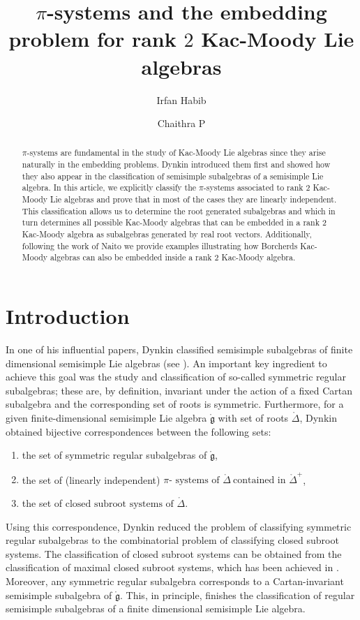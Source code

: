 \documentclass[12pt,reqno]{amsart}
\title{$\pi$-systems and the embedding problem for rank $2$ Kac-Moody Lie algebras}
\author{Irfan Habib}\address{Department of Mathematics, Indian Institute of Science, Bangalore 560012}
\author{Chaithra P}
\theoremstyle{plain}
\theoremstyle{definition}
\theoremstyle{remark}
\newcommand{\lie}[1]{\mathfrak{#1}}
\begin{document}
\begin{abstract}
    $\pi$-systems are fundamental in the study of Kac-Moody Lie algebras since they arise naturally in the embedding problems. Dynkin introduced them first and showed how they also appear in the classification of semisimple subalgebras of a semisimple Lie algebra. In this article, we explicitly classify the $\pi$-systems associated to rank $2$ Kac-Moody Lie algebras and prove that in most of the cases they are linearly independent. This classification allows us to determine the root generated subalgebras and which in turn determines all possible Kac-Moody algebras that can be embedded in a rank $2$ Kac-Moody algebra as subalgebras generated by real root vectors. Additionally, following the work of Naito we provide examples illustrating how Borcherds Kac-Moody algebras can also be embedded inside a rank $2$ Kac-Moody algebra.
\end{abstract}
\maketitle
\section{Introduction}

In one of his influential papers, Dynkin classified semisimple subalgebras of finite dimensional semisimple Lie algebras (see \cite{dynkin1952semisimple}). An important key ingredient to achieve this goal was the study and classification of so-called symmetric regular subalgebras; these are, by definition, invariant under the action of a fixed Cartan subalgebra and the corresponding set of roots is symmetric. Furthermore, for a given finite-dimensional semisimple Lie algebra $\mathring{\lie g}$ with set of roots $\mathring{\Delta}$, Dynkin obtained bijective correspondences between the following sets: 
\begin{enumerate}
 \item  the set of symmetric regular subalgebras of $\mathring{\lie g}$,
     \item the set of (linearly independent) $ \pi\text{- systems of }\mathring{\Delta}\ \text{contained in  } \mathring{\Delta}^+$,
     \item the set of $ \text{closed subroot systems of } \mathring{\Delta}$.
 \end{enumerate}
 Using this correspondence, Dynkin reduced the problem of classifying symmetric regular subalgebras to the combinatorial problem of classifying closed subroot systems. The classification of closed subroot systems can be obtained from the classification of maximal closed subroot systems, which has been achieved in \cite{BdS}. Moreover, any symmetric regular subalgebra corresponds to a Cartan-invariant semisimple subalgebra of $\mathring{\lie g}$. This, in principle, finishes the classification of regular semisimple subalgebras of a finite dimensional semisimple Lie algebra. 
 
\end{document}
